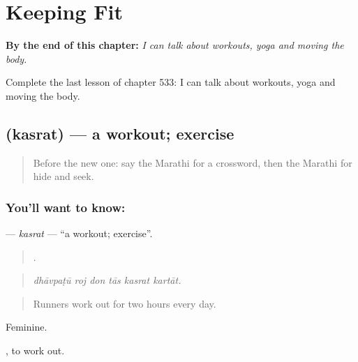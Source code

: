 
\chapter{Keeping Fit}
\label{ch:mr-keeping-fit}

\begin{chapteropening}
\textbf{By the end of this chapter:} \emph{I can talk about workouts, yoga and moving the body.}

Complete the last lesson of chapter 533: I can talk about workouts, yoga and moving the body.
\end{chapteropening}

\section[\texorpdfstring{\mr{कसरत} (kasrat)}{कसरत (kasrat)}]{ (kasrat) — a workout; exercise}

\label{lesson:MR-C533-kasrat}



\begin{quote}
Before the new one: say the Marathi for a crossword, then the Marathi for hide and seek.
\end{quote}

\subsection*{You'll want to know: }
\textbf{} — \emph{kasrat} — \textquotedblleft{}a workout; exercise\textquotedblright{}.

\begin{quote}
     .
\end{quote}

\begin{quote}
\emph{dhāvpaṭū roj don tās kasrat kartāt.}
\end{quote}

\begin{quote}
Runners work out for two hours every day.
\end{quote}

Feminine.

 , to work out.


